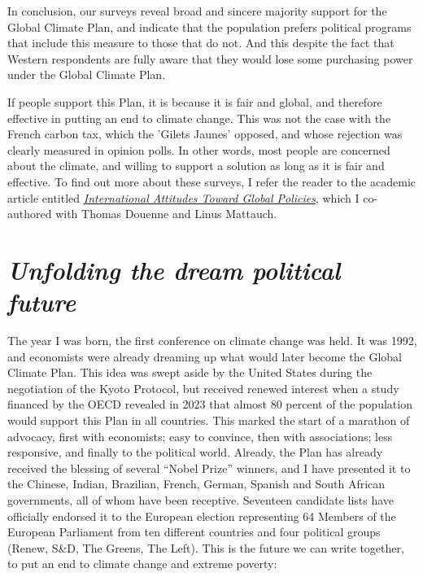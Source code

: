 \documentclass[a5paper,english,openany]{memoir}
\begin{document}
In conclusion, %
our surveys %
reveal broad and sincere majority support for the Global Climate Plan, and indicate that the population prefers political programs that include this measure to those that do not. And this despite the fact that Western respondents are fully aware that they would lose some purchasing power under the Global Climate Plan. %

If people support this Plan, it is because it is fair and global, and therefore effective in putting an end to climate change. This was not the case with the French carbon tax, which the 'Gilets Jaunes' %
opposed, and whose rejection was clearly measured in opinion polls. In other words, most people are concerned about the climate, and willing to support a solution as long as it is fair and effective. 
To find out more about these surveys, I refer the reader to the academic article entitled \href{https://papers.ssrn.com/sol3/papers.cfm?abstract_id=4448523}{\textit{International Attitudes Toward Global Policies}}, which I co-authored with Thomas Douenne and Linus Mattauch. 

\chapter*{\textit{Unfolding the dream political %
future}}\label{ch:narr_reve}

The year I was born, the first conference on climate change was held. It was 1992, and economists were already dreaming up what would later become the Global Climate Plan. This idea was swept aside by the United States during the negotiation of the Kyoto Protocol, but received renewed interest when a study financed by the OECD revealed in 2023 that almost 80 percent of the population would support this Plan in all countries. This marked the start of a marathon of advocacy, first with economists; %
easy to convince, then with associations;  %
less responsive, and finally to the political world. Already, %
the Plan has already received the blessing of several ``Nobel Prize'' winners, and I  %
have presented it to the Chinese, Indian, Brazilian, French, German, Spanish and South African governments, all of whom have been receptive. Seventeen candidate lists have officially endorsed it to the European election representing 64 Members of the European Parliament from ten different countries and four political groups (Renew, S\&D, The Greens, The Left). %
This is the future %
we can write together, to put an end to climate change and extreme poverty: 
\end{document}
